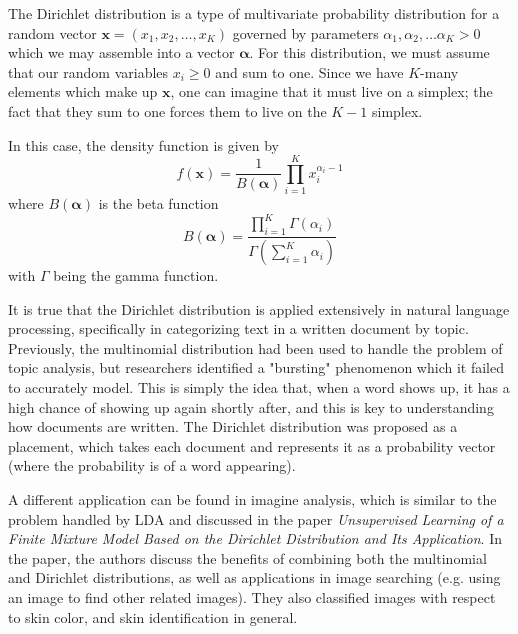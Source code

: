 \documentclass[12pt,letterpaper,boxed]{math_hw_pset}
\begin{document}
\begin{solution}
    The Dirichlet distribution is a type of multivariate probability distribution
    for a random vector $\bm{x} = (x_1, x_2, \dots, x_K)$ governed by parameters 
    $\alpha_1, \alpha_2, \dots \alpha_K > 0$ which we may assemble into a vector 
    $\bm{\alpha}$. For this distribution, we must assume 
    that our random variables $x_i \ge 0$ and sum to one. 
    Since we have $K$-many elements which make up $\bm{x}$, one can imagine 
    that it must live on a simplex; the fact that they sum to one forces them to 
    live on the $K - 1$ simplex. 
    
    In this case, the density function 
    is given by 
    \[
        f(\bm{x}) = \frac{1}{B(\bm{\alpha})}\prod_{i = 1}^{K}x_i^{\alpha_i -1}
    \]
    where $B(\bm{\alpha})$ is the beta function 
    \[
        B(\bm{\alpha})=  
        \frac{\prod_{i = 1}^{K}\Gamma(\alpha_i) }{\Gamma\left( \sum_{i = 1}^{K}\alpha_i \right)}
    \]
    with $\Gamma$ being the gamma function. 

    It is true that the Dirichlet distribution is applied extensively in natural language
    processing, specifically in categorizing text in a written document by topic. 
    Previously, the multinomial distribution had been used to handle the problem 
    of topic analysis, but researchers identified a "bursting" phenomenon which it 
    failed to accurately model. This is simply the idea that, when a word shows up, it 
    has a high chance of showing up again shortly after, and this is key to understanding 
    how documents are written.
    The Dirichlet distribution was proposed as a placement, which takes each document 
    and represents it as a probability vector (where the probability is of a word appearing).  

    A different application can be found in imagine analysis, which is similar to the 
    problem handled by LDA and discussed in the paper \emph{Unsupervised Learning of a Finite Mixture
    Model Based on the Dirichlet Distribution
    and Its Application}. In the paper, the authors discuss the benefits of combining both the 
    multinomial and Dirichlet distributions, as well as applications in image searching (e.g. using an image 
    to find other related images). They also classified images with respect to skin color, 
    and skin identification in general.

    

\end{solution}
\end{document}
